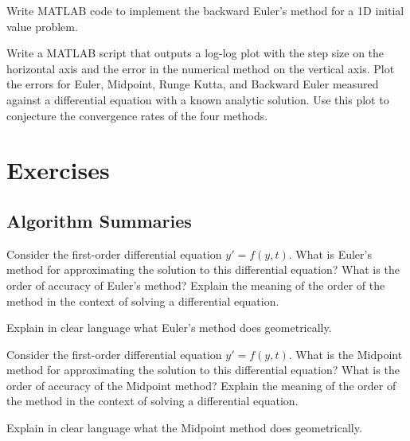 \begin{problem}
    Write MATLAB code to implement the backward Euler's method for a 1D initial value
    problem. \\
\end{problem}


\begin{problem}
    Write a MATLAB script that outputs a log-log plot with the step size on the horizontal
    axis and the error in the numerical method on the vertical axis.  Plot the errors for
    Euler, Midpoint, Runge Kutta, and Backward Euler measured against a differential
    equation with a known analytic solution.  Use this plot to conjecture the convergence
    rates of the four methods.
\end{problem}



\newpage\section{Exercises}

\subsection{Algorithm Summaries}

\begin{problem}
    Consider the first-order differential equation $y' = f(y,t)$.  What is Euler's method
    for approximating the solution to this differential equation?  What is the order of
    accuracy of Euler's method?  Explain the meaning of the order of the method in the
    context of solving a differential equation.
\end{problem}

\begin{problem}
    Explain in clear language what Euler's method does geometrically.
\end{problem}

\begin{problem}
    Consider the first-order differential equation $y' = f(y,t)$.  What is the Midpoint method
    for approximating the solution to this differential equation?  What is the order of
    accuracy of the Midpoint method?  Explain the meaning of the order of the method in the
    context of solving a differential equation.
\end{problem}
\begin{problem}
    Explain in clear language what the Midpoint method does geometrically.
\end{problem}

